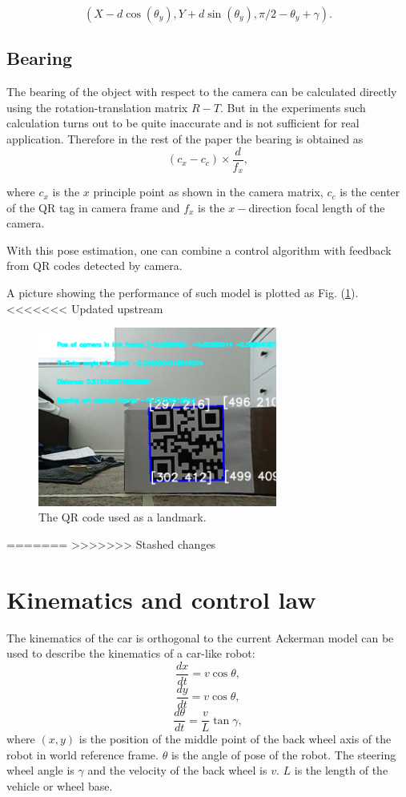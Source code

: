 \documentclass[12pt]{article}
\begin{document}
$$(X-d\cos(\theta_y),Y+d\sin(\theta_y),\pi/2-\theta_y+\gamma).$$
\subsection{Bearing}
The bearing of the object with respect to the camera can be calculated directly using the rotation-translation matrix $R-T$. But in the experiments such calculation turns out to be quite inaccurate and is not sufficient for real application. Therefore in the rest of the paper the bearing is obtained as $$(c_x-c_c)\times \frac{d}{f_x},$$

where $c_x$ is the $x$ principle point as shown in the camera matrix, $c_c$ is the center of the QR tag in camera frame and $f_x$ is the $x-$direction focal length of the camera.

With this pose estimation, one can combine a control algorithm with feedback from QR codes detected by camera.

A picture showing the performance of such model is plotted as  Fig. (\ref{QR}).
<<<<<<< Updated upstream
\begin{figure}[htbp]
\centering
\includegraphics[width=0.7\textwidth]{../figures/bearing_distance.png}
\caption{The QR code used as a landmark.}\label{QR}
\end{figure}
=======
>>>>>>> Stashed changes
\section{Kinematics and control law}
\label{kine}
The kinematics of the car is orthogonal to the current 
Ackerman model can be used to describe the kinematics of a car-like robot: 
$$\frac{d x}{dt}=v\cos \theta,$$
$$\frac{d y}{dt}=v\cos \theta,$$
$$\frac{d \theta}{dt}=\frac{v}{L}\tan \gamma,$$
where $(x,y)$ is the position of the middle point of the back wheel axis of the robot in world reference frame. $\theta$ is the angle of pose of the robot. The steering wheel angle is $\gamma$ and the velocity of the back wheel is $v$. $L$ is the length of the vehicle or wheel base.
\end{document}

